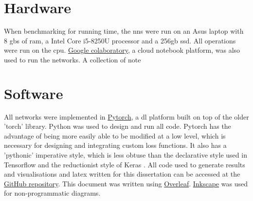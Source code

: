 \begin{landscape}
\end{landscape}


\section{Hardware}

When benchmarking for running time, the \gls{nn}s were run on an Asus laptop with 8 \gls{gb}s of \gls{ram}, a Intel Core i5-8250U processor and a 256\gls{gb} \gls{ssd}. All operations were run on the \gls{cpu}. \href{https://colab.research.google.com/}{Google colaboratory}, a cloud notebook platform, was also used to run the networks. A collection of note 

\section{Software}

All networks were implemented in \href{https://pytorch.org/}{Pytorch}, a \gls{dl} platform built on top of the older 'torch' library. Python was used to design and run all code. Pytorch has the advantage of being more easily able to be modified at a low level, which is necessary for designing and integrating custom loss functions. It also has a 'pythonic' imperative style, which is less obtuse than the declarative style used in Tensorflow and the reductionist style of Keras \cite{tale_dl}. All code used to generate results and visualisations and latex written for this dissertation can be accessed at the \href{https://github.com/MattSkiff/Flip-Probability-as-a-Loss-Function-in-Convolutional-Neural-Networks-for-Image-Classification}{GitHub repository}. This document was written using \href{https://www.overleaf.com/}{Overleaf}. \href{https://inkscape.org/}{Inkscape} was used for non-programmatic diagrams.